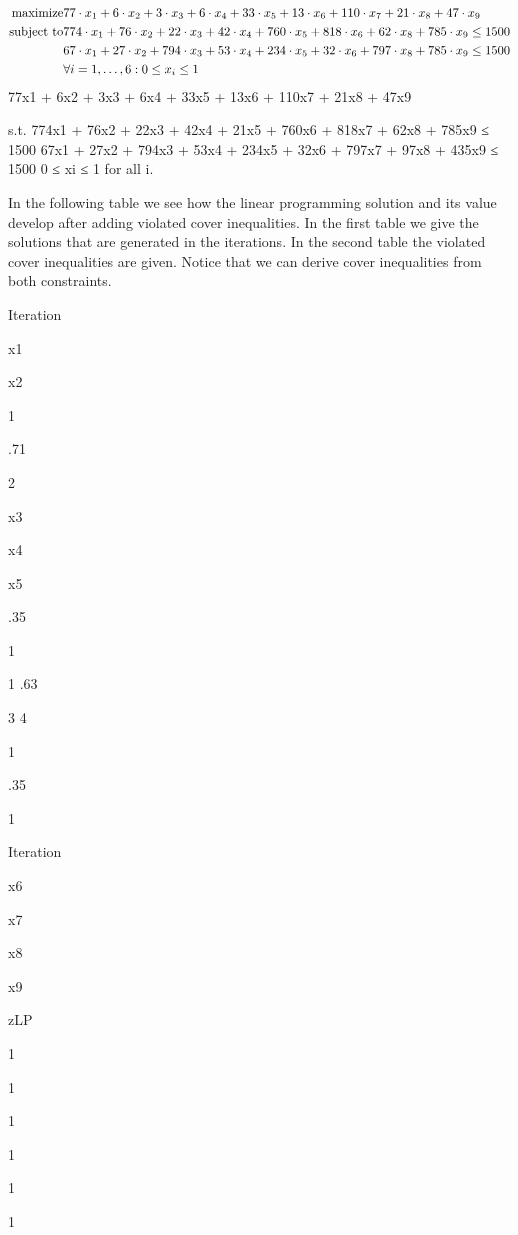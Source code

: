 \begin{example}
\begin{eqnarray}
\mbox{maximize}&77\cdot x_1+6\cdot x_2+3\cdot x_3+6\cdot x_4+33\cdot x_5+13\cdot x_6+110\cdot x_7+21\cdot x_8+47\cdot x_9\\
\mbox{subject to}&774\cdot x_1+76\cdot x_2+22\cdot x_3+42\cdot x_4+760\cdot x_5+818\cdot x_6+62\cdot x_8+785\cdot x_9\leq 1500\\
&67\cdot x_1+27\cdot x_2+794\cdot x_3+53\cdot x_4+234\cdot x_5+32\cdot x_6+797\cdot x_8+785\cdot x_9\leq 1500\\
&\forall\rangei[i]{1}{6}:0\leq x_i\leq 1
\end{eqnarray}
77x1 + 6x2 + 3x3 + 6x4 + 33x5 + 13x6 + 110x7 + 21x8 + 47x9

s.t. 774x1 + 76x2 + 22x3 + 42x4 + 21x5 + 760x6 + 818x7 + 62x8 + 785x9 ≤ 1500
67x1 + 27x2 + 794x3 + 53x4 + 234x5 + 32x6 + 797x7 + 97x8 + 435x9 ≤ 1500
0 ≤ xi ≤ 1 for all i.

In the following table we see how the linear programming solution and its value develop after adding
violated cover inequalities. In the first table we give the solutions that are generated in the iterations.
In the second table the violated cover inequalities are given. Notice that we can derive cover inequalities
from both constraints.

Iteration

x1

x2

1

.71

2

x3

x4

x5

.35

1

1
.63

3
4

1

.35

1

Iteration

x6

x7

x8

x9

zLP

1

1

1

1

1

1


\end{example}

